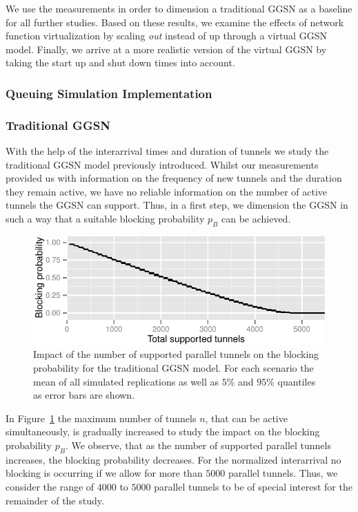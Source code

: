We use the measurements in order to dimension a traditional \gls{GGSN} as a baseline for all further studies. Based on these results, we examine the effects of network function virtualization by scaling \emph{out} instead of up through a virtual \gls{GGSN} model. Finally, we arrive at a more realistic version of the virtual \gls{GGSN} by taking the start up and shut down times into account.


\subsubsection{Queuing Simulation Implementation}


\subsubsection{Traditional GGSN}
\label{c4:sec:eval_traditional_ggsn}

With the help of the interarrival times and duration of tunnels we study the traditional \gls{GGSN} model previously introduced. Whilst our measurements provided us with information on the frequency of new tunnels and the duration they remain active, we have no reliable information on the number of active tunnels the \gls{GGSN} can support. Thus, in a first step, we dimension the \gls{GGSN} in such a way that a suitable blocking probability $p_B$ can be achieved.

\begin{figure}[htp]
  \centering
    \includegraphics[width=1.0\textwidth]{images/traditional-blocking.pdf}
  \caption{Impact of the number of supported parallel tunnels on the blocking probability for the traditional \gls{GGSN} model. For each scenario the mean of all simulated replications as well as $5\%$ and $95\%$ quantiles as error bars are shown.}
  \label{c4:fig:traditional_blocking}
\end{figure}

In Figure~\ref{c4:fig:traditional_blocking} the maximum number of tunnels $n$, that can be active simultaneously, is gradually increased to study the impact on the blocking probability $p_B$. We observe, that as the number of supported parallel tunnels increases, the blocking probability decreases. For the normalized interarrival no blocking is occurring if we allow for more than $5000$ parallel tunnels. Thus, we consider the range of $4000$ to $5000$ parallel tunnels to be of special interest for the remainder of the study.


